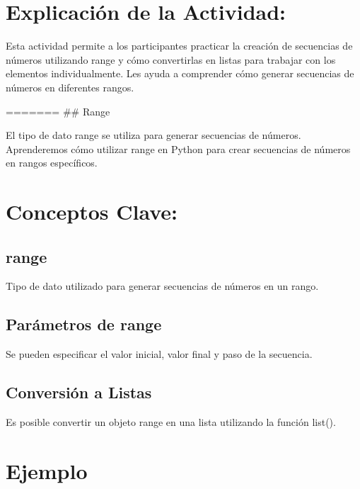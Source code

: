 \documentclass[
  a4paper,
  DIV=11,
  numbers=noendperiod,
  onepage,
  openany]{scrreprt}
\begin{document}
\hypertarget{explicaciuxf3n-de-la-actividad-20}{%
\section{Explicación de la
Actividad:}\label{explicaciuxf3n-de-la-actividad-20}}

Esta actividad permite a los participantes practicar la creación de
secuencias de números utilizando range y cómo convertirlas en listas
para trabajar con los elementos individualmente. Les ayuda a comprender
cómo generar secuencias de números en diferentes rangos.

======= \#\# Range

El tipo de dato range se utiliza para generar secuencias de números.
Aprenderemos cómo utilizar range en Python para crear secuencias de
números en rangos específicos.

\hypertarget{conceptos-clave-23}{%
\section{Conceptos Clave:}\label{conceptos-clave-23}}

\hypertarget{range-2}{%
\subsection{range}\label{range-2}}

Tipo de dato utilizado para generar secuencias de números en un rango.

\hypertarget{paruxe1metros-de-range-1}{%
\subsection{Parámetros de range}\label{paruxe1metros-de-range-1}}

Se pueden especificar el valor inicial, valor final y paso de la
secuencia.

\hypertarget{conversiuxf3n-a-listas-1}{%
\subsection{Conversión a Listas}\label{conversiuxf3n-a-listas-1}}

Es posible convertir un objeto range en una lista utilizando la función
list().

\hypertarget{ejemplo-23}{%
\section{Ejemplo}\label{ejemplo-23}}
\end{document}
